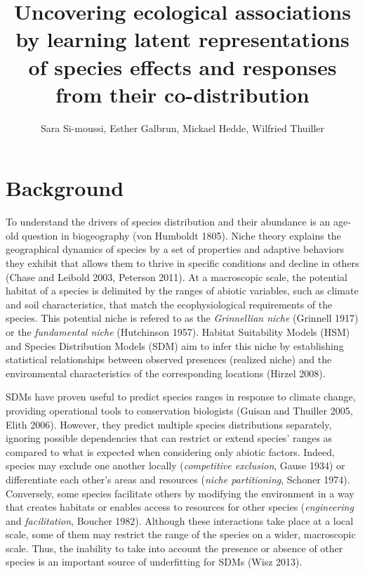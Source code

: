 \documentclass[]{article}
\title{Uncovering ecological associations by learning latent representations of species effects and responses from their co-distribution}
\author{Sara Si-moussi, Esther Galbrun, Mickael Hedde, Wilfried Thuiller}
\begin{document}
\maketitle

\section{Background}
To understand the drivers of species distribution and their abundance
is an age-old question in biogeography (von Humboldt 1805). Niche
theory explains the geographical dynamics of species by a set of
properties and adaptive behaviors they exhibit that allows them to
thrive in specific conditions and decline in others (Chase and Leibold
2003, Peterson 2011).  At a macroscopic scale, the potential habitat
of a species is delimited by the ranges of abiotic variables, such as
climate and soil characteristics, that match the ecophysiological
requirements of the species. This potential niche is refered to as the
\emph{Grinnellian niche} (Grinnell 1917) or the \emph{fundamental
  niche} (Hutchinson 1957).  Habitat Suitability Models (HSM) and
Species Distribution Models (SDM) aim to infer this niche by
establishing statistical relationships between observed presences
(realized niche) and the environmental characteristics of the
corresponding locations (Hirzel 2008).

SDMs have proven useful to predict species ranges in response to
climate change, providing operational tools to conservation biologists
(Guisan and Thuiller 2005, Elith 2006). However, they predict multiple
species distributions separately, ignoring possible dependencies that
can restrict or extend species' ranges as compared to what is expected
when considering only abiotic factors.  Indeed, species may exclude
one another locally (\emph{competitive exclusion}, Gause 1934) or
differentiate each other's areas and resources (\emph{niche
  partitioning}, Schoner 1974). Conversely, some species facilitate
others by modifying the environment in a way that creates habitats or
enables access to resources for other species (\emph{engineering} and
\emph{facilitation}, Boucher 1982).  Although these interactions take
place at a local scale, some of them may restrict the range of the
species on a wider, macroscopic scale.  Thus, the inability to take
into account the presence or absence of other species is an important
source of underfitting for SDMs (Wisz 2013).
\end{document}
